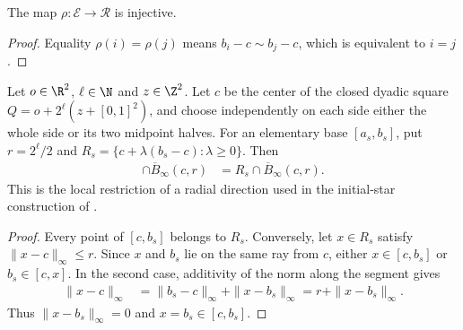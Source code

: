 \begin{lemma}
    \label{thm:area_law_cell_fan_ray_injective}
    \leanok
    The map $\rho:\mathcal E\to\mathcal R$ is injective.
\end{lemma}
\begin{proof}\leanok
    Equality $\rho(i)=\rho(j)$ means $b_i-c\sim b_j-c$, which is equivalent
    to $i=j$.
\end{proof}


\begin{lemma}
    \label{thm:area_law_cell_fan_radial_ray_restriction}
    \leanok
    Let $o\in\R^2$, $\ell\in\N$ and $z\in\Z^2$.
    Let $c$ be the center of the closed dyadic square
    $Q=o+2^\ell(z+[0,1]^2)$, and choose independently on each side
    either the whole side or its two midpoint halves.
    For an elementary base $[a_s,b_s]$, put $r=2^\ell/2$ and
    $R_s=\{c+\lambda(b_s-c):\lambda\ge0\}$.
    Then
    \begin{align}
        [c,b_s]\cap\overline B_\infty(c,r)
         & =R_s\cap\overline B_\infty(c,r).
    \end{align}
    This is the local restriction of a radial direction used in the
    initial-star construction of \cite[Section~11]{OpenAI2026AreaLaw}.
\end{lemma}
\begin{proof}\leanok
    Every point of $[c,b_s]$ belongs to $R_s$.
    Conversely, let $x\in R_s$ satisfy $\|x-c\|_\infty\le r$.
    Since $x$ and $b_s$ lie on the same ray from $c$, either
    $x\in[c,b_s]$ or $b_s\in[c,x]$.
    In the second case, additivity of the norm along the segment gives
    \begin{align}
        \|x-c\|_\infty
         & =\|b_s-c\|_\infty+\|x-b_s\|_\infty
        =r+\|x-b_s\|_\infty.
    \end{align}
    Thus $\|x-b_s\|_\infty=0$ and $x=b_s\in[c,b_s]$.
\end{proof}
